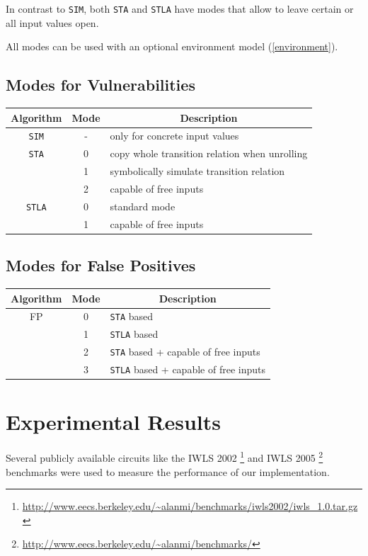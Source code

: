 \documentclass[a4paper,10pt]{article}
\begin{document}
In contrast to \texttt{SIM}, both \texttt{STA} and \texttt{STLA}  have modes that allow to leave certain or all input values open.

All modes can be used with an optional environment model (\ref{environment}).

\subsection{Modes for Vulnerabilities}
{%
\newcommand{\mc}[3]{\multicolumn{#1}{#2}{#3}}
\begin{center}
\begin{tabular}{c|c|l}
Algorithm & Mode & \mc{1}{c}{Description}\\
\hline \hline
\texttt{SIM} & - & only for concrete input values\\
\hline
\texttt{STA} & 0 & copy whole transition relation when unrolling\\
  & 1 & symbolically simulate transition relation \\
  & 2 & capable of free inputs\\
\hline  
\texttt{STLA} & 0 & standard mode\\
  & 1 & capable of free inputs
\end{tabular}
\end{center}
}%

\subsection{Modes for False Positives}
{%
\newcommand{\mc}[3]{\multicolumn{#1}{#2}{#3}}
\begin{center}
\begin{tabular}{c|c|l}
Algorithm & Mode & \mc{1}{c}{Description}\\
\hline \hline
FP & 0 & \texttt{STA} based\\
  & 1 & \texttt{STLA} based \\
  & 2 & \texttt{STA} based + capable of free inputs\\
  & 3 & \texttt{STLA} based + capable of free inputs
\end{tabular}
\end{center}
}%

\newpage
\section{Experimental Results}
Several publicly available circuits like the 
IWLS 2002 \footnote{\url{http://www.eecs.berkeley.edu/~alanmi/benchmarks/iwls2002/iwls_1.0.tar.gz}}
and IWLS 2005 \footnote{\url{http://www.eecs.berkeley.edu/~alanmi/benchmarks/}} benchmarks
were used to measure the performance of our implementation.
\end{document}
